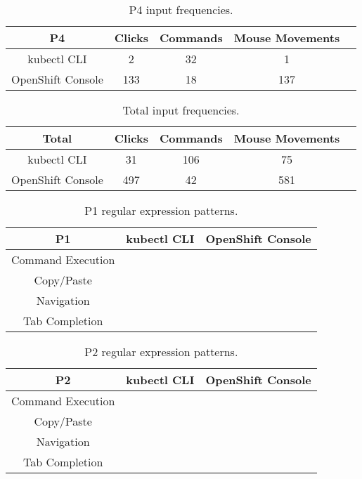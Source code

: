 \documentclass[11pt, oneside]{article}   	%
\begin{document}
\begin{table}
 \centering
  \begin{tabular}{ | c | c | c | c | c | } 
  \hline
  P4 & Clicks & Commands & Mouse Movements \\ 
  \hline
  kubectl CLI & 2 & 32 & 1 \\ 
  \hline
  OpenShift Console & 133 & 18 & 137 \\ 
  \hline
  \end{tabular}
 \caption{P4 input frequencies.}
 \label{table:t4}
\end{table}

\begin{table}
 \centering
  \begin{tabular}{ | c | c | c | c | c | } 
  \hline
  Total & Clicks & Commands & Mouse Movements \\ 
  \hline
  kubectl CLI & 31 & 106 & 75 \\ 
  \hline
  OpenShift Console & 497 & 42 & 581 \\ 
  \hline
  \end{tabular}
 \caption{Total input frequencies.}
 \label{table:t5}
\end{table}

\begin{table}
 \centering
  \begin{tabular}{ | c | c | c | } 
  \hline
  P1 & kubectl CLI & OpenShift Console \\ 
  \hline
  Command Execution &  &  \\ 
  \hline
  Copy/Paste & & \\
  \hline
  Navigation & & \\
  \hline
  Tab Completion & & \\
  \hline
  \end{tabular}
 \caption{P1 regular expression patterns.}
 \label{table:t6}
\end{table}

\begin{table}
 \centering
  \begin{tabular}{ | c | c | c | } 
  \hline
  P2 & kubectl CLI & OpenShift Console \\ 
  \hline
  Command Execution &  &  \\ 
  \hline
  Copy/Paste & & \\
  \hline
  Navigation & & \\
  \hline
  Tab Completion & & \\
  \hline
  \end{tabular}
 \caption{P2 regular expression patterns.}
 \label{table:t7}
\end{table}
\end{document}
